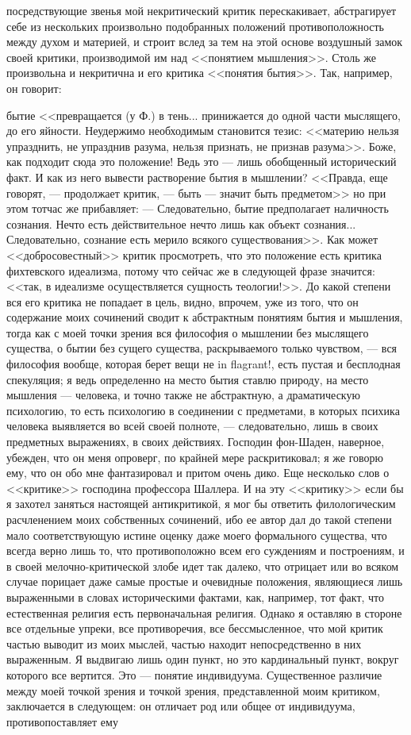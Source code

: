 \documentclass[12pt]{article}
\begin{document}
посредствующие звенья мой некритический критик перескакивает, абстрагирует себе из нескольких произвольно подобранных положений противоположность между духом и материей, и строит вслед за тем на этой основе воздушный замок своей критики, производимой им над <<понятием мышления>>. Столь же произвольна и некритична и его критика <<понятия бытия>>. Так, например, он говорит: 

бытие <<превращается (у Ф.) в тень... принижается до одной части мыслящего, до его яйности. Неудержимо необходимым становится тезис: <<материю нельзя упразднить, не упразднив разума, нельзя признать, не признав разума>>. Боже, как подходит сюда это положение! Ведь это --- лишь обобщенный исторический факт. И как из него вывести растворение бытия в мышлении? <<Правда, еще говорят, --- продолжает критик, --- быть --- значит быть предметом>>  но при этом тотчас же прибавляет: --- Следовательно, бытие предполагает наличность сознания. Нечто есть действительное нечто лишь как объект сознания... Следовательно, сознание есть мерило всякого существования>>. Как может <<добросовестный>> критик просмотреть, что это положение есть критика фихтевского идеализма, потому что сейчас же в следующей фразе значится: <<так, в идеализме осуществляется сущность теологии!>>. До какой степени вся его критика не попадает в цель, видно, впрочем, уже из того, что он содержание моих сочинений сводит к абстрактным понятиям бытия и мышления, тогда как с моей точки зрения вся философия о мышлении без мыслящего существа, о бытии без сущего существа, раскрываемого только чувством, --- вся философия вообще, которая берет вещи не in flagrant!, есть пустая и бесплодная спекуляция; я ведь определенно на место бытия ставлю природу, на место мышления --- человека, и точно также не абстрактную, а драматическую психологию, то есть психологию в соединении с предметами, в которых психика человека выявляется во всей своей полноте, --- следовательно, лишь в своих предметных выражениях, в своих действиях. Господин фон-Шаден, наверное, убежден, что он меня опроверг, по крайней мере раскритиковал; я же говорю ему, что он обо мне фантазировал и притом очень дико. Еще несколько слов о <<критике>> господина профессора Шаллера. И на эту <<критику>>  если бы я захотел заняться настоящей антикритикой, я мог бы ответить филологическим расчленением моих собственных сочинений, ибо ее автор дал до такой степени мало соответствующую истине оценку даже моего формального существа, что всегда верно лишь то, что противоположно всем его суждениям и построениям, и в своей мелочно-критической злобе идет так далеко, что отрицает или во всяком случае порицает даже самые простые и очевидные положения, являющиеся лишь выраженными в словах историческими фактами, как, например, тот факт, что естественная религия есть первоначальная религия. Однако я оставляю в стороне все отдельные упреки, все противоречия, все бессмысленное, что мой критик частью выводит из моих мыслей, частью находит непосредственно в них выраженным. Я выдвигаю лишь один пункт, но это кардинальный пункт, вокруг которого все вертится. Это --- понятие индивидуума. Существенное различие между моей точкой зрения и точкой зрения, представленной моим критиком, заключается в следующем: он отличает род или общее от индивидуума, противопоставляет ему 
\end{document}
